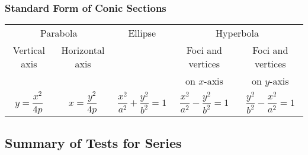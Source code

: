 \subsubsection*{Standard Form of Conic Sections}

{\addtolength{\tabcolsep}{6pt}
\begin{tabular}{ccccc}
\multicolumn{2}{c}{Parabola} & \hspace{5em}Ellipse\hspace{5em} & \multicolumn{2}{c}{Hyperbola} \\
Vertical axis & Horizontal axis & & Foci and vertices & Foci and vertices \\
& & & on $x$-axis & on $y$-axis \\
$y=\dfrac{x^2}{4p}$ & $x=\dfrac{y^2}{4p}$ & $\dfrac{x^2}{a^2}+\dfrac{y^2}{b^2}=1$ & $\dfrac{x^2}{a^2}-\dfrac{y^2}{b^2}=1$ & $\dfrac{y^2}{b^2}-\dfrac{x^2}{a^2}=1$
\end{tabular}}

\clearpage

\subsection{Summary of Tests for Series}\label{tab_series_tests}

